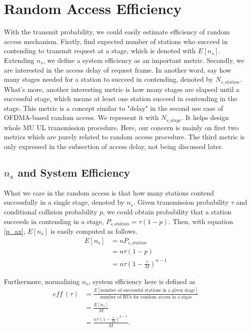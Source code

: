 \section{Random Access Efficiency}
With the transmit probability, we could easily estimate efficiency of random access mechanism. 
Firstly, find expected number of stations who succeed in contending to transmit request at a stage, which is denoted with $E[n_s]$. 
Extending $n_s$, we define a system efficiency as an important metric.
Secondly, we are interested in the access delay of request frame. 
In another word, say how many stages needed for a station to succeed in contending, denoted by $N_{s\_station}$.
What's more, another interesting metric is how many stages are elapsed until a successful stage, which means at least one station succeed in contending in the stage. This metric is a concept similar to "delay" in the second use case of OFDMA-based random access. We represent it with $N_{s\_stage}$. It helps design whole MU UL transmission procedure. 
Here, our concern is mainly on first two metrics which are purely related to random access procedure. The third metric is only expressed in the subsection of access delay, not being discussed later. 

\subsection{$n_s$ and System Efficiency}
What we care in the random access is that how many stations contend successfully in a single stage, denoted by $n_s$.
Given transmission probability $\tau$ and conditional collision probability $p$, we could obtain probability that a station succeeds in contending in a stage, $P_{s\_station} = \tau (1-p)$.
Then, with equation \ref{p_ax}, $E[n_s]$ is easily computed as follows. 
\begin{align}
\label{equ_ns}
E[n_s] &= n P_{s\_station} \nonumber \\
		&= n\tau (1-p) \nonumber \\
		&= n\tau (1-\frac{\tau}{M})^{n-1}
\end{align}

Furthermore, normalizing $n_s$, system efficiency here is defined as 
\begin{align}
\label{eff_def}
\textit{eff}\ (\tau) &= \frac{E[\text{number of successful stations in a given stage}]}{\text{number of RUs for random access in a stgae}} \nonumber\\
					 &=\frac{E[n_s]}{M} \nonumber \\
					 &= \frac{n\tau(1-\frac{\tau}{M})^{n-1}}{M}.
\end{align}

